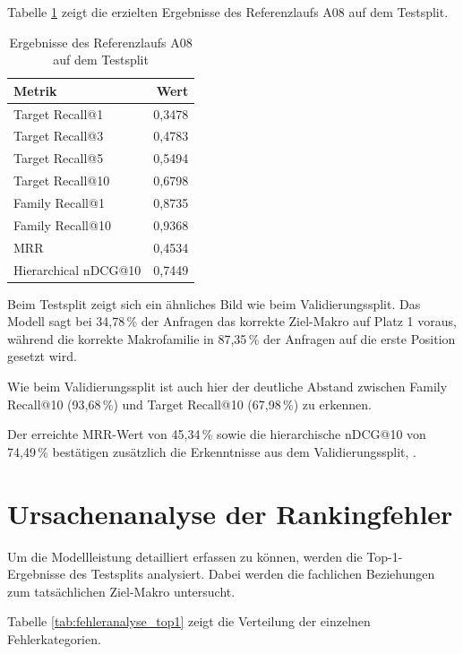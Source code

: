 Tabelle \ref{tab:test_ergebnisse} zeigt die erzielten Ergebnisse des Referenzlaufs A08 auf dem Testsplit. 

\begin{table}[H] 
  \centering 
  \caption{Ergebnisse des Referenzlaufs A08 auf dem Testsplit} 
  \label{tab:test_ergebnisse} 
  \begin{tabular}{lr} \toprule \textbf{Metrik} & \textbf{Wert} \\ \midrule 
    Target Recall@1 & 0,3478 \\
    Target Recall@3 & 0,4783 \\
    Target Recall@5 & 0,5494 \\
    Target Recall@10 & 0,6798 \\
    Family Recall@1 & 0,8735 \\
    Family Recall@10 & 0,9368 \\
    MRR & 0,4534 \\
    Hierarchical nDCG@10 & 0,7449 \\
    \bottomrule 
  \end{tabular} 
\end{table}

Beim Testsplit zeigt sich ein ähnliches Bild wie beim Validierungssplit. Das Modell sagt bei 34,78\,\% der Anfragen das korrekte Ziel-Makro \parencite{EPLAN-Makros} auf Platz 1 voraus, während die korrekte Makrofamilie in 87,35\,\% der Anfragen auf die erste Position gesetzt wird.

Wie beim Validierungssplit ist auch hier der deutliche Abstand zwischen Family Recall@10 (93,68\,\%) und Target Recall@10 (67,98\,\%) zu erkennen. 

Der erreichte MRR-Wert von 45,34\,\% sowie die hierarchische nDCG@10 von 74,49\,\% bestätigen zusätzlich die Erkenntnisse aus dem Validierungssplit, \parencite{LTR_Configuration_Test_Series}.

\section{Ursachenanalyse der Rankingfehler}

Um die Modellleistung detailliert erfassen zu können, werden die Top-1-Ergebnisse des Testsplits analysiert. Dabei werden die fachlichen Beziehungen zum tatsächlichen Ziel-Makro untersucht.

Tabelle \ref{tab:fehleranalyse_top1} zeigt die Verteilung der einzelnen Fehlerkategorien. 

